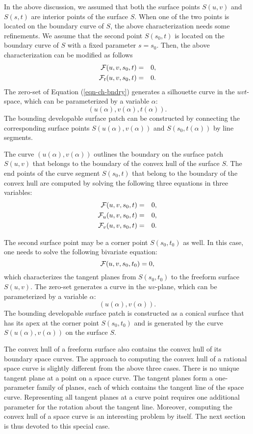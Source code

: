 \documentclass[doublespacing]{elsart}
\begin{document}
In the above discussion, we assumed that both the surface points
$S(u,v)$ and $S(s,t)$ are interior points of the surface $S$.
When one of the two points is located on the boundary curve of $S$,
the above characterization needs some refinements.
We assume that the second point $S(s_0,t)$ is located
on the boundary curve of $S$ with a fixed parameter $s=s_0$.
Then, the above characterization can be modified as follows
\begin{eqnarray}
   {\cal F}(u,v,s_0,t) &=& 0, \label{eqn-ch-bndry}\\
   {\cal F}_t(u,v,s_0,t) &=& 0. \nonumber
\end{eqnarray}
The zero-set of Equation (\ref{eqn-ch-bndry}) generates a silhouette curve 
in the $uvt$-space, which can be parameterized by a variable $\alpha$:
\[
   (u(\alpha),v(\alpha),t(\alpha)).
\]
The bounding developable surface patch can be constructed
by connecting the corresponding surface points
$S(u(\alpha),v(\alpha))$ and $S(s_0,t(\alpha))$ by line segments.

The curve $(u(\alpha),v(\alpha))$ outlines the boundary
on the surface patch $S(u,v)$ that belongs to the boundary of
the convex hull of the surface $S$.  The end points of
the curve segment $S(s_0,t)$ that belong to the boundary
of the convex hull are computed by solving the following
three equations in three variables:
\begin{eqnarray*}
   {\cal F}(u,v,s_0,t) &=& 0,\\
   {\cal F}_u(u,v,s_0,t) &=& 0,\\
   {\cal F}_v(u,v,s_0,t) &=& 0.
\end{eqnarray*}

The second surface point may be a corner point $S(s_0,t_0)$ as well.
In this case, one needs to solve the following bivariate equation:
\[
   {\cal F}(u,v,s_0,t_0) = 0,
\]
which characterizes the tangent planes from $S(s_0,t_0)$
to the freeform surface $S(u,v)$.
The zero-set generates a curve in the $uv$-plane,
which can be parameterized by a variable $\alpha$:
\[
   (u(\alpha),v(\alpha)).
\]
The bounding developable surface patch is constructed
as a conical surface that has its apex at the corner point
$S(s_0,t_0)$ and is generated by the curve
$S(u(\alpha),v(\alpha))$ on the surface $S$.

The convex hull of a freeform surface also contains
the convex hull of its boundary space curves.
The approach to computing the convex hull of a rational space curve
is slightly different from the above three cases.
There is no unique tangent plane at a point on a space curve.
The tangent planes form a one-parameter family of planes,
each of which contains the tangent line of the space curve.
Representing all tangent planes at a curve point requires
one additional parameter for the rotation about the tangent line.
Moreover, computing the convex hull of a space curve is 
an interesting problem by itself.
The next section is thus devoted to this special case.
\end{document}
